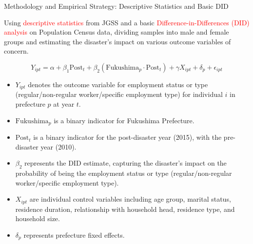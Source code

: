 \documentclass[serif, aspectratio=169]{beamer}
\begin{document}
\begin{frame}{Methodology and Empirical Strategy: Descriptive Statistics and Basic DID}

\vspace{-0.2cm}

 Using \textcolor{red}{descriptive statistics} from JGSS and a basic \textcolor{red}{Difference-in-Differences (DID) analysis} on Population Census data, dividing samples into male and female groups and estimating the disaster's impact on various outcome variables of concern.

\vspace{-0.1cm}

    \begin{equation}
    Y_{ipt} = \alpha + \beta_1 \text{Post}_t + \beta_2 (\text{Fukushima}_p \cdot \text{Post}_t) + \gamma X_{ipt} + \delta_p + \epsilon_{ipt}
    \end{equation}

    \begin{itemize}
    \item $Y_{ipt}$ denotes the outcome variable for employment status or type (regular/non-regular worker/specific employment type) for individual $i$ in prefecture $p$ at year $t$.
    \item $\text{Fukushima}_p$ is a binary indicator for Fukushima Prefecture.
    \item $\text{Post}_t$ is a binary indicator for the post-disaster year (2015), with the pre-disaster year (2010).
    \item $\beta_2$ represents the DID estimate, capturing the disaster's impact on the probability of being the employment status or type (regular/non-regular worker/specific employment type).
    \item $X_{ipt}$ are individual control variables including age group, marital status, residence duration, relationship with household head, residence type, and household size.
    \item $\delta_p$ represents prefecture fixed effects.
    \end{itemize}
\end{frame}

\end{document}
